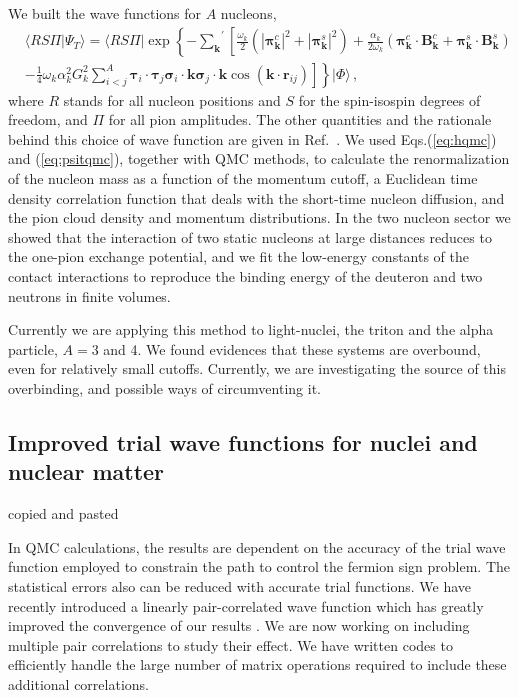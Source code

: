 \documentclass[12pt,letterpaper]{article}
\newcommand{\bvec}[1]{\boldsymbol {#1}}
\begin{document}
We built the wave functions for $A$ nucleons,
\begin{align}
\label{eq:psitqmc}
&\langle RS\Pi|\Psi_T\rangle =
\langle RS\Pi|
\exp\left\{
-{\sum_{\bvec k}}^\prime \left [
\frac{\omega_k}{2}(
|\bvec{\pi}_{\bvec{k}}^c|^2
+|\bvec {\pi}_{\bvec{k}}^s|^2)
+\frac{\alpha_k}{2\omega_k}
\left (
\bvec \pi_{\bvec k}^c \cdot \bvec B^c_{\bvec k}
+\bvec \pi_{\bvec k}^s \cdot \bvec B^s_{\bvec k}
\right )\right.\right.
\nonumber\\
&
\left .
\left .
-\frac{1}{4}\omega_k\alpha_k^2 G_k^2 \sum_{i<j}^A
\bvec \tau_i\cdot\bvec \tau_j
\bvec\sigma_i\cdot \bvec k
\bvec\sigma_j\cdot \bvec k
\cos(\bvec k\cdot \bvec r_{ij})
\right] \right \}
|\Phi\rangle\, ,
\end{align}
where $R$ stands for all nucleon positions and $S$ for the spin-isospin
degrees of freedom, and $\Pi$ for all pion amplitudes. The other
quantities and the rationale behind this choice of wave function
are given in Ref.~\cite{mad18}. We used Eqs.(\ref{eq:hqmc}) and (\ref{eq:psitqmc}), together with QMC methods, to calculate
the renormalization of the nucleon mass
as a function of the momentum cutoff, a Euclidean time density
correlation function that deals with the short-time nucleon diffusion, and the pion cloud density and
momentum distributions. In the two nucleon sector we showed that the interaction of two static nucleons
at large distances reduces to the one-pion exchange potential, and we fit the low-energy constants of the
contact interactions to reproduce the binding energy of the deuteron and two neutrons in finite volumes.

Currently we are 
applying this method to light-nuclei, the triton and the alpha particle, $A=3$ and 4.
We found evidences that these systems are overbound, even for
relatively small cutoffs. Currently, we are investigating the source
of this overbinding, and possible ways of circumventing it.

\subsection{Improved trial wave functions for nuclei and nuclear matter}
\label{sec:improved}

{\color{red} copied and pasted}

In QMC calculations, the results are dependent on the accuracy of the trial wave function employed
to constrain the path to control the fermion sign problem.
The statistical errors also can be reduced with accurate trial functions.
We have recently introduced a linearly pair-correlated wave function which has greatly improved the convergence of our results \cite{gan14}. We are now working on including multiple pair correlations to study their effect. We have written codes to efficiently handle the large number of matrix operations required to include these additional correlations.
\end{document}
